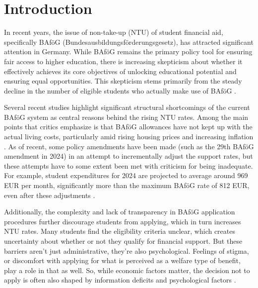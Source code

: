 %
%



\section{Introduction} \label{sec:intro}

In recent years, the issue of non-take-up (NTU) of student financial aid, specifically BAföG (Bundesausbildungsförderungsgesetz), has attracted significant attention in Germany. While BAföG remains the primary policy tool for ensuring fair access to higher education, there is increasing skepticism about whether it effectively achieves its core objectives of unlocking educational potential and ensuring equal opportunities. This skepticism stems primarily from the steady decline in the number of eligible students who actually make use of BAföG \citep{gwosc_krisenbewaltigung_2022, meier_bafog_2024}.

Several recent studies highlight significant structural shortcomings of the current BAföG system as central reasons behind the rising NTU rates. Among the main points that critics emphasize is that BAföG allowances have not kept up with the actual living costs, particularly amid rising housing prices and increasing inflation \citep{meier_bafog_2024}. As of recent, some policy amendments have been made (such as the 29th BAföG amendment in 2024) in an attempt to incrementally adjust the support rates, but these attempts have to some extent been met with criticism for being inadequate. For example, student expenditures for 2024 are projected to average around 969 EUR per month, significantly more than the maximum BAföG rate of 812 EUR, even after these adjustments \citep{meier_bafog_2024}.

Additionally, the complexity and lack of transparency in BAföG application procedures further discourage students from applying, which in turn increases NTU rates. Many students find the eligibility criteria unclear, which creates uncertainty about whether or not they qualify for financial support. But these barriers aren’t just administrative, they’re also psychological. Feelings of stigma, or discomfort with applying for what is perceived as a welfare type of benefit, play a role in that as well. So, while economic factors matter, the decision not to apply is often also shaped by information deficits and psychological factors \citep{gwosc_krisenbewaltigung_2022, staack_von_2017}.

